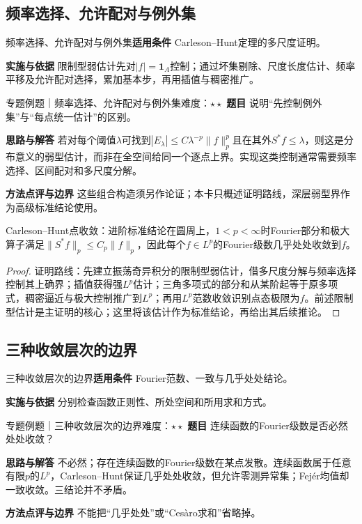 \subsection{频率选择、允许配对与例外集}\label{mat:fourier_advanced:selection}
\begin{method}{频率选择、允许配对与例外集}\textbf{适用条件} Carleson--Hunt定理的多尺度证明。\par\textbf{实施与依据} 限制型弱估计先对$|f|=\mathbf1_A$控制；通过坏集剔除、尺度长度估计、频率平移及允许配对选择，累加基本步，再用插值与稠密推广。\end{method}
\begin{example}{专题例题｜频率选择、允许配对与例外集}{难度：$\star\star$}
\textbf{题目} 说明“先控制例外集”与“每点统一估计”的区别。\par\textbf{思路与解答} 若对每个阈值$\lambda$可找到$|E_\lambda|\le C\lambda^{-p}\|f\|_p^p$且在其外$S^*f\le\lambda$，则这是分布意义的弱型估计，而非在全空间给同一个逐点上界。实现这类控制通常需要频率选择、区间配对和多尺度分解。\par\textbf{方法点评与边界} 这些组合构造须另作论证；本卡只概述证明路线，深层弱型界作为高级标准结论使用。
\end{example}
\begin{theorem}{Carleson--Hunt点收敛：进阶标准结论}在圆周上，$1<p<\infty$时Fourier部分和极大算子满足$\|S^*f\|_p\le C_p\|f\|_p$，因此每个$f\in L^p$的Fourier级数几乎处处收敛到$f$。\end{theorem}
\begin{proof}证明路线：先建立振荡奇异积分的限制型弱估计，借多尺度分解与频率选择控制其上确界；插值获得强$L^p$估计；三角多项式的部分和从某阶起等于原多项式，稠密逼近与极大控制推广到$L^p$；再用$L^p$范数收敛识别点态极限为$f$。前述限制型估计是主证明的核心；这里将该估计作为标准结论，再给出其后续推论。\end{proof}
\subsection{三种收敛层次的边界}\label{mat:fourier_advanced:convergence}
\begin{method}{三种收敛层次的边界}\textbf{适用条件} Fourier范数、一致与几乎处处结论。\par\textbf{实施与依据} 分别检查函数正则性、所处空间和所用求和方式。\end{method}
\begin{example}{专题例题｜三种收敛层次的边界}{难度：$\star\star$}
\textbf{题目} 连续函数的Fourier级数是否必然处处收敛？\par\textbf{思路与解答} 不必然；存在连续函数的Fourier级数在某点发散。连续函数属于任意有限$p$的$L^p$，Carleson--Hunt保证几乎处处收敛，但允许零测异常集；Fejér均值却一致收敛。三结论并不矛盾。\par\textbf{方法点评与边界} 不能把“几乎处处”或“Cesàro求和”省略掉。
\end{example}
